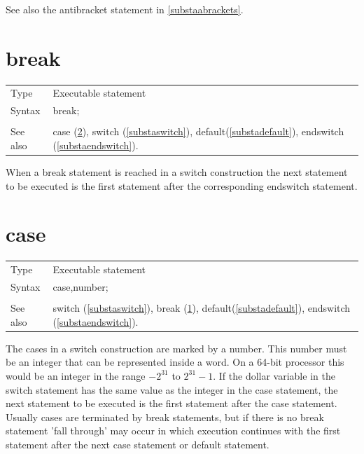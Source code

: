 \noindent See also the antibracket statement in \ref{substaabrackets}.
\vspace{10mm}

%
\section{break}
\label{substabreak}

\noindent \begin{tabular}{ll}
Type & Executable statement\\
Syntax & break; \\
\\ See also & case (\ref{substacase}), switch (\ref{substaswitch}),
		 default(\ref{substadefault}), endswitch (\ref{substaendswitch}).
\end{tabular} \vspace{4mm}

\noindent When a break statement is reached in a switch construction the 
next statement to be executed is the first statement after the 
corresponding endswitch statement.

\vspace{10mm}
%
%
\section{case}
\label{substacase}

\noindent \begin{tabular}{ll}
Type & Executable statement\\
Syntax & case,number; \\
\\ See also & switch (\ref{substaswitch}), break (\ref{substabreak}),
		 default(\ref{substadefault}), endswitch (\ref{substaendswitch}).
\end{tabular} \vspace{4mm}

\noindent The cases in a switch construction are marked by a number. This 
number must be an integer that can be represented inside a {\FORM} word. 
On a 64-bit processor this would be an integer in the range $-2^{31}$ to 
$2^{31}-1$. If the dollar variable in the switch statement has the same 
value as the integer in the case statement, the next statement to be 
executed is the first statement after the case statement. Usually cases are 
terminated by break statements, but if there is no break statement 'fall 
through' may occur in which execution continues with the first statement 
after the next case statement or default statement.

